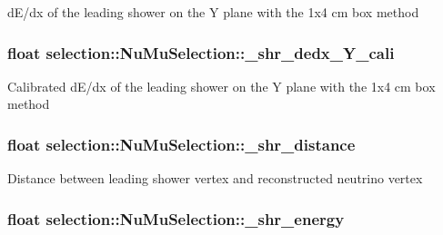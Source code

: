 d\-E/dx of the leading shower on the Y plane with the 1x4 cm box method \hypertarget{classselection_1_1NuMuSelection_a086d0bb1635bcd0121a8453c499c0bf4}{
\subsubsection[{\-\_\-shr\-\_\-dedx\-\_\-\-Y\-\_\-cali}]{\setlength{\rightskip}{0pt plus 5cm}float selection\-::\-Nu\-Mu\-Selection\-::\-\_\-shr\-\_\-dedx\-\_\-\-Y\-\_\-cali\hspace{0.3cm}{\ttfamily [private]}}}\label{classselection_1_1NuMuSelection_a086d0bb1635bcd0121a8453c499c0bf4}
Calibrated d\-E/dx of the leading shower on the Y plane with the 1x4 cm box method \hypertarget{classselection_1_1NuMuSelection_a2da7e7448ef5334cb3988e5d7be786f3}{
\subsubsection[{\-\_\-shr\-\_\-distance}]{\setlength{\rightskip}{0pt plus 5cm}float selection\-::\-Nu\-Mu\-Selection\-::\-\_\-shr\-\_\-distance\hspace{0.3cm}{\ttfamily [private]}}}\label{classselection_1_1NuMuSelection_a2da7e7448ef5334cb3988e5d7be786f3}
Distance between leading shower vertex and reconstructed neutrino vertex \hypertarget{classselection_1_1NuMuSelection_a06ebfacd01494668815b794a793e58cf}{
\subsubsection[{\-\_\-shr\-\_\-energy}]{\setlength{\rightskip}{0pt plus 5cm}float selection\-::\-Nu\-Mu\-Selection\-::\-\_\-shr\-\_\-energy\hspace{0.3cm}{\ttfamily [private]}}}\label{classselection_1_1NuMuSelection_a06ebfacd01494668815b794a793e58cf}
